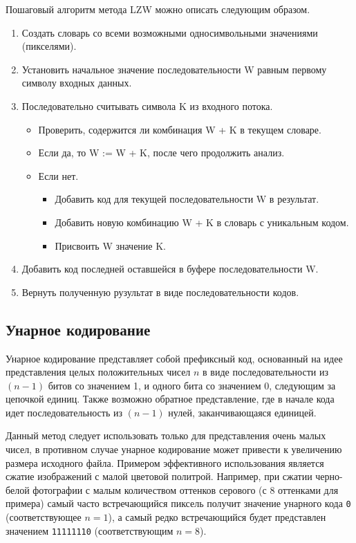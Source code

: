 Пошаговый алгоритм метода LZW можно описать следующим образом.
\begin{enumerate}
    \item Создать словарь со всеми возможными односимвольными значениями (пикселями).
    \item Установить начальное значение последовательности W равным первому символу входных данных.
    \item Последовательно считывать символа K из входного потока.
    \begin{itemize}
        \item Проверить, содержится ли комбинация W + K в текущем словаре.
        \item Если да, то W := W + K, после чего продолжить анализ.
        \item Если нет.
        \begin{itemize}
            \item Добавить код для текущей последовательности W в результат.
            \item Добавить новую комбинацию W + K в словарь с уникальным кодом.
            \item Присвоить W значение K.
        \end{itemize}
    \end{itemize}
    \item Добавить код последней оставшейся в буфере последовательности W.
    \item Вернуть полученную рузультат в виде последовательности кодов.
\end{enumerate}

\subsection{Унарное кодирование}

Унарное кодирование представляет собой префиксный код, основанный на идее представления целых положительных чисел $n$ в виде последовательности из $(n - 1)$ битов со значением 1, и одного бита со значением 0, следующим за цепочкой единиц. Также возможно обратное представление, где в начале кода идет последовательность из $(n - 1)$ нулей, заканчивающаяся единицей.

Данный метод следует использовать только для представления очень малых чисел, в противном случае унарное кодирование может привести к увеличению размера исходного файла. Примером эффективного использования является сжатие изображений с малой цветовой политрой. Например, при сжатии черно-белой фотографии с малым количеством оттенков серового (с 8 оттенками для примера) самый часто встречающийся пиксель получит значение унарного кода \texttt{0} (соответствующее $n = 1$), а самый редко встречающийся будет представлен значением \texttt{11111110} (соответствующим $n = 8$).


